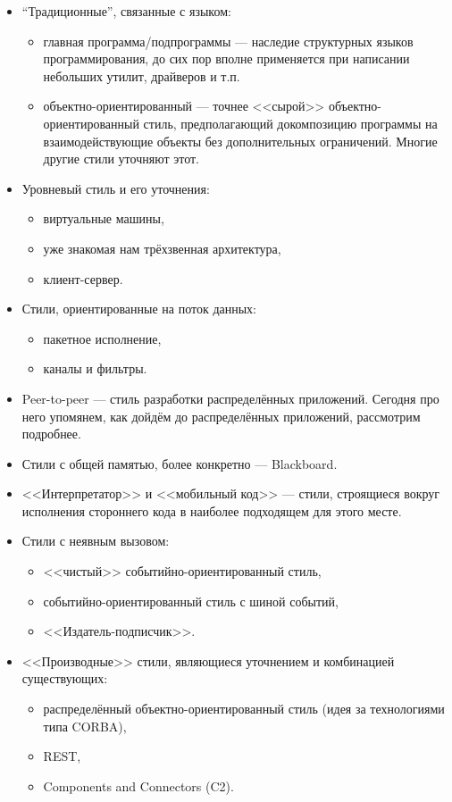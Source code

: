 \documentclass[a5paper]{article}
\begin{document}
\begin{itemize}
    \item ``Традиционные'', связанные с языком: 
    \begin{itemize}
        \item главная программа/подпрограммы --- наследие структурных языков программирования, до сих пор вполне применяется при написании небольших утилит, драйверов и т.п.
        \item объектно-ориентированный --- точнее <<сырой>> объектно-ориентированный стиль, предполагающий докомпозицию программы на взаимодействующие объекты без дополнительных ограничений. Многие другие стили уточняют этот.
    \end{itemize}
    \item Уровневый стиль и его уточнения:
    \begin{itemize}
        \item виртуальные машины,
        \item уже знакомая нам трёхзвенная архитектура,
        \item клиент-сервер.
    \end{itemize}
    \item Стили, ориентированные на поток данных:
    \begin{itemize}
        \item пакетное исполнение,
        \item каналы и фильтры.
    \end{itemize}
    \item Peer-to-peer --- стиль разработки распределённых приложений. Сегодня про него упомянем, как дойдём до распределённых приложений, рассмотрим подробнее.
    \item Стили с общей памятью, более конкретно --- Blackboard.
    \item <<Интерпретатор>> и <<мобильный код>> --- стили, строящиеся вокруг исполнения стороннего кода в наиболее подходящем для этого месте.
    \item Стили с неявным вызовом:
    \begin{itemize}
        \item <<чистый>> событийно-ориентированный стиль,
        \item событийно-ориентированный стиль с шиной событий,
        \item <<Издатель-подписчик>>.
    \end{itemize}
    \item <<Производные>> стили, являющиеся уточнением и комбинацией существующих:
    \begin{itemize}
        \item распределённый объектно-ориентированный стиль (идея за технологиями типа CORBA),
        \item REST,
        \item Components and Connectors (C2).
    \end{itemize}
\end{itemize}
\end{document}
